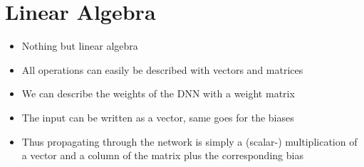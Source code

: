 \documentclass[t]{beamer} %
\begin{document}
\section{Linear Algebra}
\begin{frame}
    \begin{itemize}[<+->]
        \item Nothing but linear algebra
        \item All operations can easily be described with vectors and matrices \\
        \item We can describe the weights of the DNN with a weight matrix
        \item The input can be written as a vector, same goes for the biases
        \item Thus propagating through the network is simply a (scalar-) multiplication of a vector and a column of the matrix plus the corresponding bias
    \end{itemize}
\end{frame}
\end{document}
